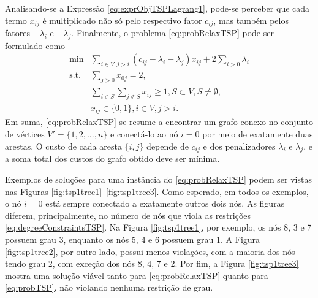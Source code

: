 {Analisando-se a Expressão \eqref{eq:exprObjTSPLagrang1}, pode-se perceber que cada termo $x_{ij}$ é multiplicado não só pelo respectivo fator $c_{ij}$, mas também pelos fatores $-\lambda_i$ e $-\lambda_j$. Finalmente, o problema \eqref{eq:probRelaxTSP} pode ser formulado como
\begin{align}
	\min & \sum_{i \in V, j > i} (c_{ij} - \lambda_i - \lambda_j) x_{ij} + 2 \sum_{i > 0} \lambda_i \tag{TSP$_\lambda$} \\
	\text{s.t. } & \sum_{j>0} x_{0j} = 2, \label{} \\
	& \sum_{i \in S}\sum_{j \notin S} x_{ij} \geq 1, S \subset V, S \neq \emptyset, \label{} \\
	& x_{ij} \in \{0,1\}, i \in V, j > i. \label{}
\end{align}
Em suma, \eqref{eq:probRelaxTSP} se resume a encontrar um grafo conexo no conjunto de vértices  $V' = \{1,2,\dots,n\}$ e conectá-lo ao nó $i=0$ por meio de exatamente duas arestas. O custo de cada aresta $\{i,j\}$ depende de $c_{ij}$ e dos  penalizadores $\lambda_i$ e $\lambda_j$, e a soma total dos custos do grafo obtido deve ser mínima. 

Exemplos de soluções para uma instância do \eqref{eq:probRelaxTSP} podem ser vistas nas Figuras \ref{fig:tsp1tree1}--\ref{fig:tsp1tree3}. Como esperado, em todos os exemplos, o nó $i=0$ está sempre conectado a exatamente outros dois nós. As figuras diferem, principalmente, no número de nós que viola as restrições  \eqref{eq:degreeConstraintsTSP}. Na Figura \ref{fig:tsp1tree1}, por exemplo, os nós 8, 3 e 7 possuem grau 3, enquanto os nós 5, 4 e 6 possuem grau 1. A Figura \ref{fig:tsp1tree2}, por outro lado, possui menos violações, com a maioria dos nós tendo grau 2, com exceção dos nós 8, 4, 7 e 2. Por fim, a Figura \ref{fig:tsp1tree3} mostra uma solução viável tanto para \eqref{eq:probRelaxTSP} quanto para \eqref{eq:probTSP}, não violando nenhuma restrição de grau.



\begin{figure}[!ht]
	\centering
\end{figure}}
